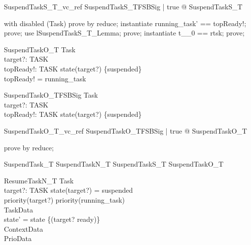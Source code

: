 \documentclass[a4paper, 12pt]{article}
\begin{document}
\begin{theorem}{SuspendTaskS\_T\_vc\_ref}
\forall  SuspendTaskS\_TFSBSig | true @ \pre  SuspendTaskS\_T
\end{theorem}

\begin{zproof}
with disabled (Task) prove by reduce;
instantiate running\_task' == topReady!;
prove;
use lSuspendTaskS\_T\_Lemma;
prove;
instantiate t\_\_0 == rtsk;
prove;
\end{zproof}

\begin{schema}{SuspendTaskO\_T}
  \Xi Task\\
  target?: TASK\\
  topReady!: TASK
\where
  state(target?) \in  \{suspended\}\\
  topReady! = running\_task
\end{schema}

\begin{schema}{SuspendTaskO\_TFSBSig}
  Task\\
  target?: TASK\\
  topReady!: TASK
\where
  state(target?) \in  \{suspended\}
\end{schema}

\begin{theorem}{SuspendTaskO\_T\_vc\_ref}
\forall  SuspendTaskO\_TFSBSig | true @ \pre  SuspendTaskO\_T
\end{theorem}

\begin{zproof}
prove by reduce;
\end{zproof}


\begin{zed}
SuspendTask\_T  SuspendTaskN\_T \lor SuspendTaskS\_T
                \lor SuspendTaskO\_T
\end{zed}


\begin{schema}{ResumeTaskN\_T}
  \Delta Task\\
  target?: TASK
\where
  state(target?) = suspended\\
  priority(target?) \leq  priority(running\_task)\\
  \Xi TaskData\\
  state' = state \oplus  \{(target? \mapsto  ready)\}\\
  \Xi ContextData\\
  \Xi PrioData
\end{schema}
\end{document}
